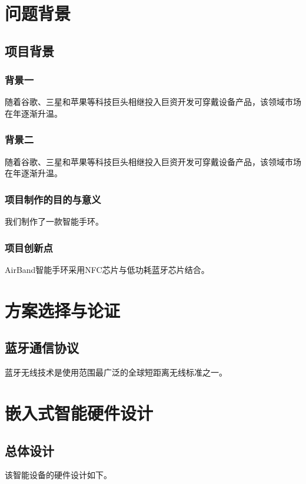 

\chapter{问题背景}
\section{项目背景}
\subsection{背景一}
随着谷歌、三星和苹果等科技巨头相继投入巨资开发可穿戴设备产品，该领域市场在年逐渐升温\cite{wu2013online}。


\subsection{背景二}
随着谷歌、三星和苹果等科技巨头相继投入巨资开发可穿戴设备产品，该领域市场在年逐渐升温。 

\subsection{项目制作的目的与意义}
我们制作了一款智能手环。

\subsection{项目创新点}
AirBand智能手环采用NFC芯片与低功耗蓝牙芯片结合。


\chapter{方案选择与论证}


\section{蓝牙通信协议}

蓝牙无线技术是使用范围最广泛的全球短距离无线标准之一。

\chapter{嵌入式智能硬件设计}
\section{总体设计}
该智能设备的硬件设计如下。


